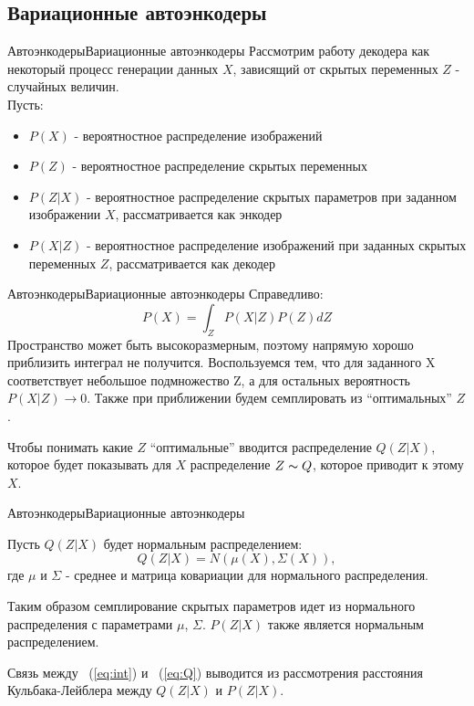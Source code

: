 \documentclass{beamer}
\begin{document}
\subsection{Вариационные автоэнкодеры}

\begin{frame}{Автоэнкодеры}{Вариационные автоэнкодеры}
Рассмотрим работу декодера как некоторый процесс генерации данных $X$, зависящий от скрытых переменных $Z$ - случайных величин.\\
Пусть:
\begin{itemize}
\item $P(X)$ - вероятностное распределение изображений
\item $P(Z)$ - вероятностное распределение скрытых переменных
\item $P(Z|X)$ - вероятностное распределение скрытых параметров при заданном изображении $X$, рассматривается как энкодер
\item $P(X|Z)$ - вероятностное распределение изображений при заданных скрытых переменных $Z$, рассматривается как декодер
\end{itemize}
\end{frame}

\begin{frame}{Автоэнкодеры}{Вариационные автоэнкодеры}
Справедливо:
\begin{equation}\label{eq:int}
P(X) = \int_{Z} P(X|Z)P(Z) dZ
\end{equation}
Пространство может быть высокоразмерным, поэтому напрямую хорошо приблизить интеграл не получится. Воспользуемся тем, что для заданного X соответствует небольшое подмножество Z, а для остальных вероятность $P(X|Z) \to 0$. Также при приближении будем семплировать из ``оптимальных'' $Z$. \par\medskip
Чтобы понимать какие $Z$ ``оптимальные'' вводится распределение $Q(Z|X)$, которое будет показывать для $X$ распределение $Z \thicksim Q$, которое приводит к этому $X$.
\end{frame}

\begin{frame}{Автоэнкодеры}{Вариационные автоэнкодеры}

Пусть $Q(Z|X)$ будет нормальным распределением:
\begin{equation}\label{eq:Q}
Q(Z|X) = N(\mu(X), \Sigma(X)),
\end{equation}
где $\mu$ и $\Sigma$ - среднее и матрица ковариации для нормального распределения. \par\medskip
Таким образом семплирование скрытых параметров идет из нормального распределения с параметрами $\mu$, $\Sigma$. $P(Z|X)$ также является нормальным распределением. \par\medskip
Связь между ~(\ref{eq:int}) и ~(\ref{eq:Q}) выводится из рассмотрения расстояния Кульбака-Лейблера между $Q(Z|X)$ и $P(Z|X)$.

\end{frame}
\end{document}
